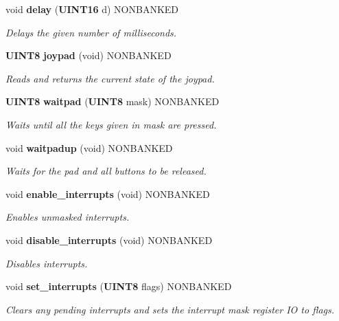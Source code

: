 \begin{CompactItemize}
\item 
void {\bf delay} ({\bf UINT16} d) NONBANKED
\begin{CompactList}\small\item\em Delays the given number of milliseconds.\item\end{CompactList}

\item 
{\bf UINT8} {\bf joypad} (void) NONBANKED
\begin{CompactList}\small\item\em Reads and returns the current state of the joypad.\item\end{CompactList}

\item 
{\bf UINT8} {\bf waitpad} ({\bf UINT8} mask) NONBANKED
\begin{CompactList}\small\item\em Waits until all the keys given in mask are pressed.\item\end{CompactList}

\item 
\label{gb.h_a70}
void {\bf waitpadup} (void) NONBANKED
\begin{CompactList}\small\item\em Waits for the pad and all buttons to be released.\item\end{CompactList}

\item 
void {\bf enable\_\-interrupts} (void) NONBANKED
\begin{CompactList}\small\item\em Enables unmasked interrupts.\item\end{CompactList}

\item 
void {\bf disable\_\-interrupts} (void) NONBANKED
\begin{CompactList}\small\item\em Disables interrupts.\item\end{CompactList}

\item 
void {\bf set\_\-interrupts} ({\bf UINT8} flags) NONBANKED
\begin{CompactList}\small\item\em Clears any pending interrupts and sets the interrupt mask register IO to flags.\item\end{CompactList}


\end{CompactItemize}

